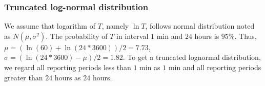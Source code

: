 \subsubsection{Truncated log-normal distribution}
We assume that logarithm of $T$, namely $\ln T$, follows normal distribution noted as $N (\mu, \sigma^2)$. The probability of $T$ in interval $1$ min and $24$ hours is $95\%$. Thus, 
$\mu = \left( \ln(60) + \ln(24*3600) \right)/2 = 7.73$, $\sigma = (\ln(24*3600) - \mu)/2 = 1.82$. To get a truncated lognormal distribution, we regard all reporting periods less than $1$ min as $1$ min and all reporting periods greater than $24$ hours as $24$ hours. 

